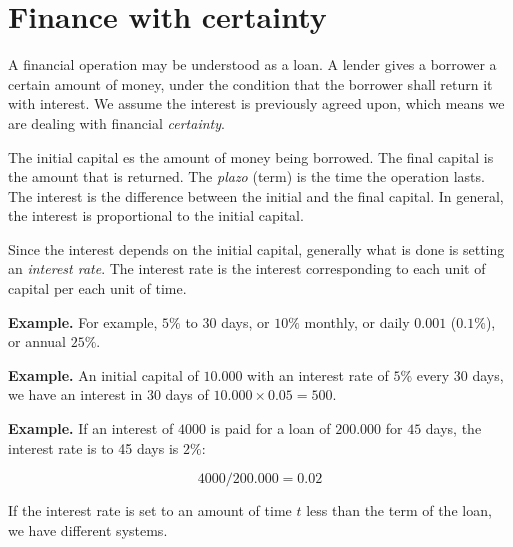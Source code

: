\documentclass[a4paper, 12pt]{article}
\theoremstyle{definition}
\begin{document}
\section{Finance with certainty}

A financial operation may be understood as a loan. A lender gives a borrower a
certain amount of money, under the condition that the borrower shall return it
with interest. We assume the interest is previously agreed upon, which means we
are dealing with financial \textit{certainty}.

The initial capital es the amount of money being borrowed. The final capital 
is the amount that is returned. The \textit{plazo} (term) is the time the
operation lasts. The interest is the difference between the initial and the
final capital. In general, the interest is proportional to the initial capital.

Since the interest depends on the initial capital, generally what is done is
setting an \textit{interest rate}. The interest rate is the interest
corresponding to each unit of capital per each unit of time. 

\begin{shaded}
    \textbf{Example.} For example, $5\%$ to 30 days, or $10\%$ monthly, or daily
    $0.001$ ($0.1\%$), or annual $25\%$.

    \textbf{Example.} An initial capital of $10.000$ with an interest rate of 
    $5\%$ every $30$ days, we have an interest in $30$ days of $10.000 \times 0.05 = 500$. 

    \textbf{Example.} If an interest of $4000$ is paid for a loan of 
    $200.000$ for $45$ days, the interest rate is to 45 days is $2\%$:

    \begin{equation*}
        4000 / 200.000 = 0.02
    \end{equation*}
\end{shaded}

If the interest rate is set to an amount of time $t$ less than the term of the loan, 
we have different systems. 
\end{document}
